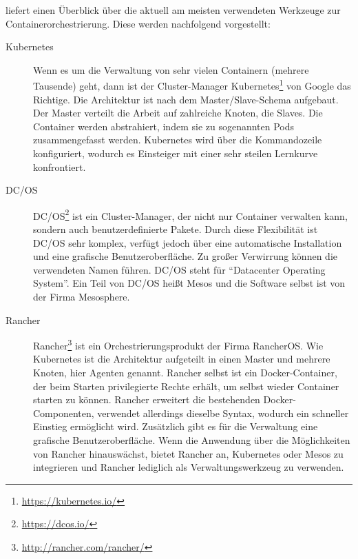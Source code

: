 \autocite{ix-orchestrierung-2017} liefert einen Überblick über die aktuell am meisten verwendeten Werkzeuge zur Containerorchestrierung. Diese werden nachfolgend vorgestellt:
\begin{description}
    \item [Kubernetes] Wenn es um die Verwaltung von sehr vielen Containern (mehrere Tausende) geht, dann ist der Cluster-Manager Kubernetes\footnote{\url{https://kubernetes.io/}} von Google das Richtige.
    Die Architektur ist nach dem Master/Slave-Schema aufgebaut. Der Master verteilt die Arbeit auf zahlreiche Knoten, die Slaves.
    Die Container werden abstrahiert, indem sie zu sogenannten Pods zusammengefasst werden.
    Kubernetes wird über die Kommandozeile konfiguriert, wodurch es Einsteiger mit einer sehr steilen Lernkurve konfrontiert.
    \item [DC/OS] DC/OS\footnote{\url{https://dcos.io/}} ist ein Cluster-Manager, der nicht nur Container verwalten kann, sondern auch benutzerdefinierte Pakete.
    Durch diese Flexibilität ist DC/OS sehr komplex, verfügt jedoch über eine automatische Installation und eine grafische Benutzeroberfläche.
    Zu großer Verwirrung können die verwendeten Namen führen. DC/OS steht für "`Datacenter Operating System"'.
    Ein Teil von DC/OS heißt Mesos und die Software selbst ist von der Firma Mesosphere.
    \item [Rancher] Rancher\footnote{\url{http://rancher.com/rancher/}} ist ein Orchestrierungsprodukt der Firma RancherOS.
    Wie Kubernetes ist die Architektur aufgeteilt in einen Master und mehrere Knoten, hier Agenten genannt.
    Rancher selbst ist ein Docker-Container, der beim Starten privilegierte Rechte erhält, um selbst wieder Container starten zu können.
    Rancher erweitert die bestehenden Docker-Componenten, verwendet allerdings dieselbe Syntax, wodurch ein schneller Einstieg ermöglicht wird.
    Zusätzlich gibt es für die Verwaltung eine grafische Benutzeroberfläche. Wenn die Anwendung über die Möglichkeiten von Rancher hinauswächst, bietet Rancher an, Kubernetes oder Mesos zu integrieren und Rancher lediglich als Verwaltungswerkzeug zu verwenden.
\end{description}
